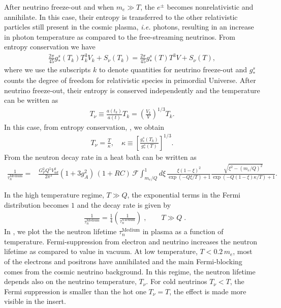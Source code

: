 After neutrino freeze-out and when $m_e\gg T$, the $e^{\pm}$ becomes nonrelativistic and annihilate. In this case, their entropy is transferred to the other relativistic particles still present in the cosmic plasma, {\it i.e.\/} photons, resulting in an increase in photon temperature as compared to the free-streaming neutrinos. From entropy conservation we have
\begin{align}
\label{Entropy}
\frac{2\pi}{45}g^s_\ast(T_k)T^3_kV_k+S_{\nu}(T_k)=\frac{2\pi}{45}g^s_\ast(T)T^3V+S_{\nu}(T),
\end{align}
where we use the subscripts $k$ to denote quantities for neutrino freeze-out and $g^s_\ast$ counts the degree of freedom for relativistic species in primordial Universe. After neutrino freeze-out, their entropy is conserved independently and the temperature can be written as
\begin{align}
T_\nu\equiv\frac{a(t_k)}{a(t)}T_k=\left(\frac{V_k}{V}\right)^{1/3}T_k.
\end{align}
In this case, from entropy conservation, , we obtain
\begin{align}
\label{Neutrino_Photon}
T_\nu=\frac{T}{\kappa},\,\,\,\,\,\,\kappa\equiv\left[\frac{g^s_\ast(T_k)}{g^s_\ast(T)}\right]^{1/3}.
\end{align}
From  the neutron decay rate in a heat bath can be written as
\begin{align}
\label{Decay_rate_03}
\frac{1}{\tau_n^\mathrm{Medium}}=&\frac{G^2_FQ^5V^2_{ud}}{2\pi^3}(1+3g^2_A)\,(1+RC)\,\mathcal{F}
\int^1_{m_e/Q}d\xi\,\frac{\xi(1-\xi)^2}{\exp\left(-Q\xi/{T}\right)+1}\frac{\sqrt{\xi^2-(m_e/Q)^2}}{\exp\left(-Q(1-\xi)\kappa/T\right)+1}. 
\end{align}

In the high temperature regime, $T\gg Q$, the exponential terms in the Fermi distribution becomes $1$ and the decay rate is given by
\begin{align}
&\frac{1}{\tau_n^\mathrm{Medium}}=\frac{1}{4}\left(\frac{1}{\tau_n^\mathrm{Vacuum}}\right)\;,
\qquad
T\gg Q\;.
\end{align}
In , we plot the the neutron lifetime $\tau^\mathrm{Medium}_n$ in plasma as a function of temperature. Fermi-suppression from electron and neutrino increases the neutron lifetime as compared to value in vacuum. At low temperature, $T<0.2\,m_e$, most of the electrons and positrons have annihilated and the main Fermi-blocking comes from the cosmic neutrino background. In this regime, the neutron lifetime depends also on the neutrino temperature, $T_\nu$. For cold neutrinos $T_\nu<T$, the Fermi suppression is smaller than the hot one $T_\nu=T$, the effect is made more visible in the insert.

